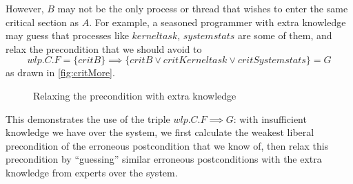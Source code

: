 However, $B$ may not be the only process or thread that wishes to enter the same critical section as $A$. 
For example, a seasoned programmer with extra knowledge may guess that processes like $kerneltask$, $systemstats$ are some of them, and relax the precondition that we should avoid to 
$$wlp.C.F = \{critB\}\implies \{critB \vee critKerneltask \vee critSystemstats\} = G$$
as drawn in \autoref{fig:critMore}. 
\begin{figure}[ht]
	\centering
	
	\caption{Relaxing the precondition with extra knowledge}
	\label{fig:critMore}
\end{figure}
This demonstrates the use of the triple $wlp.C.F{\implies} G$: with insufficient knowledge we have over the system, we first calculate the weakest liberal precondition of the erroneous postcondition that we know of, then relax this precondition by ``guessing'' similar erroneous postconditions with the extra knowledge from experts over the system. 




